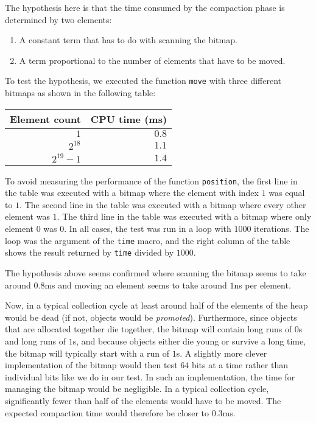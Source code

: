 The hypothesis here is that the time consumed by the compaction phase
is determined by two elements:

\begin{enumerate}
\item A constant term that has to do with scanning the bitmap.
\item A term proportional to the number of elements that have to be
  moved.
\end{enumerate}

To test the hypothesis, we executed the function \texttt{move} with
three different bitmaps as shown in the following table:

\begin{tabular}{|r|r|}
\hline
Element count & CPU time (ms)\\
\hline
$1$ & $0.8$ \\
$2^{18}$ & $1.1$\\
$2^{19}-1$ & $1.4$\\
\hline
\end{tabular}

To avoid measuring the performance of the function \texttt{position},
the first line in the table was executed with a bitmap where the
element with index $1$ was equal to $1$.  The second line in the table
was executed with a bitmap where every other element was $1$.  The
third line in the table was executed with a bitmap where only element
$0$ was $0$.  In all cases, the test was run in a loop with $1000$
iterations.  The loop was the argument of the \texttt{time} macro, and
the right column of the table shows the result returned by
\texttt{time} divided by $1000$. 

The hypothesis above seems confirmed where scanning the bitmap seems
to take around $0.8$ms and moving an element seems to take around
$1$ns per element.  

Now, in a typical collection cycle at least around half of the
elements of the heap would be dead (if not, objects would be
\emph{promoted}).  Furthermore, since objects that are allocated
together die together, the bitmap will contain long runs of $0$s and
long runs of $1$s, and because objects either die young or survive a
long time, the bitmap will typically start with a run of $1$s.  A
slightly more clever implementation of the bitmap would then test $64$
bits at a time rather than individual bits like we do in our test.  In
such an implementation, the time for managing the bitmap would be
negligible.  In a typical collection cycle, significantly fewer than
half of the elements would have to be moved.  The expected compaction
time would therefore be closer to $0.3$ms. 

